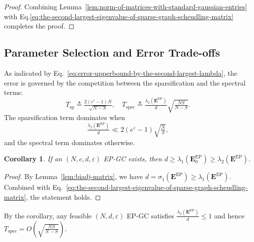 \documentclass[lettersize,journal]{IEEEtran}
\newcommand{\norm}[1]{\left\lVert#1\right\rVert}
\newcommand{\GEP}{\boldsymbol{E}^{\mathrm{EP}}}
\newcommand{\prob}[1]{\mathbb{P}\left[#1\right]}
\newtheorem{corollary}{Corollary}
\begin{document}
\begin{proof}
Combining Lemma~\ref{lem:norm-of-matrices-with-standard-gaussian-entries} with
Eq.\eqref{eq:the-second-largest-eigenvalue-of-sparse-graph-scheudling-matrix}
completes the proof.\qedhere

\end{proof}

\subsection{Parameter Selection and Error Trade-offs}
As indicated by Eq.~\eqref{eq:error-upperbound-by-the-second-largest-lambda}, the error is governed by the competition between the sparsification and the spectral terms:
\[
T_{\mathrm{sp}} \triangleq \tfrac{2(e^{\varepsilon}-1)N}{\sqrt{N-S}},
\quad
T_{\mathrm{spec}} \triangleq \tfrac{\lambda_2(\GEP)}{d}\sqrt{\tfrac{NS}{N-S}}.
\]
The sparsification term dominates when 
\[
\tfrac{\lambda_2(\GEP)}{d} \ll 2(e^\varepsilon-1)\sqrt{\tfrac{N}{S}},
\]
and the spectral term dominates otherwise.
\begin{corollary}
If an $(N, c, d, \varepsilon)$ EP-GC exists, then $ d\geq\lambda_1(\GEP_0) \geq \lambda_2(\GEP)$.
\end{corollary}
\begin{proof}
By Lemma~\ref{lem:biadj-matrix}, we have $d = \sigma_1(\GEP) \ge \lambda_1(\GEP)$.
Combined with Eq.~\eqref{eq:the-second-largest-eigenvalue-of-sparse-graph-scheudling-matrix}, the statement holds.
\end{proof}
By the corollary, any feasible $(N,d,\varepsilon)$ EP-GC satisfies $\tfrac{\lambda_2(\GEP)}{d} \le 1$ and hence $T_{\mathrm{spec}} = O\left(\sqrt{\tfrac{NS}{N-S}}\right)$.
\end{document}

